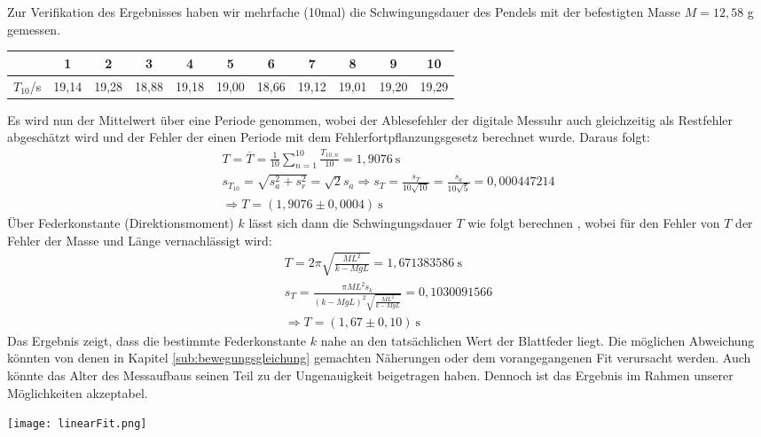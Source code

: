 Zur Verifikation des Ergebnisses haben wir mehrfache (10mal) die Schwingungsdauer des Pendels mit der befestigten Masse $M = 12,58$ g gemessen.
\begin{center}
    \begin{tabular}{ c | cccccccccc }
        {} & 1 & 2 & 3 &4 &5 &6 &7 &8 &9 &10\\
        \hline
        $T_10$/s&19,14&19,28&18,88&19,18&19,00&18,66&19,12&19,01&19,20&19,29\\
    \end{tabular}
    \label{tab:schwingung}
\end{center}
Es wird nun der Mittelwert über eine Periode genommen, wobei der Ablesefehler der digitale Messuhr auch gleichzeitig als Restfehler abgeschätzt wird und der Fehler der einen Periode mit dem Fehlerfortpflanzungsgesetz berechnet wurde. Daraus folgt:
\begin{gather}
    T = \overline{T} = \frac{1}{10} \sum_{n = 1}^{10} \frac{T_{10,n}}{10} = 1,9076~\text{s}\\
    s_{T_{10}} = \sqrt{s_a^2+s_r^2}=\sqrt{2}s_a \Rightarrow s_T = \frac{s_T}{10\sqrt{10}} = \frac{s_a}{10\sqrt{5}} = 0,000447214\\[0,5cm]
    \Rightarrow\boxed{T = (1,9076 \pm 0,0004)~\text{s}}
\end{gather}
\newpage
Über Federkonstante (Direktionsmoment) $k$ lässt sich dann die Schwingungsdauer $T$ wie folgt berechnen \citep{Leifi}, wobei für den Fehler von $T$ der Fehler der Masse und Länge vernachlässigt wird:
\begin{gather}
    T = 2\pi\sqrt{\frac{ML^2}{k- MgL}} = 1,671383586~\text{s}\\
    s_T = \frac{\pi ML^2 s_k}{(k-MgL)^2 \sqrt{\frac{ML^2}{k- MgL}}} = 0,1030091566\\[0,5cm]
    \Rightarrow\boxed{T = (1,67 \pm 0,10)~\text{s}}
\end{gather}
Das Ergebnis zeigt, dass die bestimmte Federkonstante $k$ nahe an den tatsächlichen Wert der Blattfeder liegt. Die möglichen Abweichung könnten von denen in Kapitel \ref{sub:bewegungsgleichung} gemachten Näherungen oder dem vorangegangenen Fit verursacht werden. Auch könnte das Alter des Messaufbaus seinen Teil zu der Ungenauigkeit beigetragen haben. Dennoch ist das Ergebnis im Rahmen unserer Möglichkeiten akzeptabel.
\newpage
\begin{center}
    \texttt{[image: linearFit.png]}
    \label{image:linFit}
\end{center}